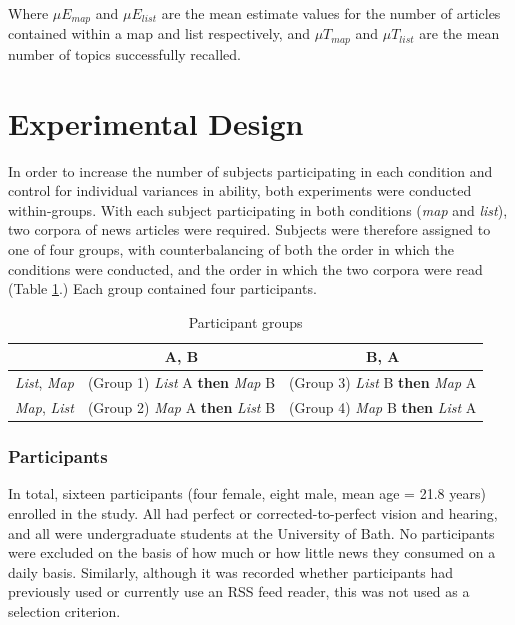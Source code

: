 Where $\mu{E}_{map}$ and $\mu{E}_{list}$ are the mean estimate values for the number of articles contained within a map and list respectively, and $\mu{T}_{map}$ and $\mu{T}_{list}$ are the mean number of topics successfully recalled.

\section{Experimental Design}

In order to increase the number of subjects participating in each condition and control for individual variances in ability, both experiments were conducted within-groups. With each subject participating in both conditions (\textit{map} and \textit{list}), two corpora of news articles were required. Subjects were therefore assigned to one of four groups, with counterbalancing of both the order in which the conditions were conducted, and the order in which the two corpora were read (Table \ref{tab:experimentalgroups}.) Each group contained four participants.\\

\begin{table}[htbp!]
\centering
\begin{tabular}{|r|c|c|}
\hline
  & A, B & B, A\\
\hline
\textit{List}, \textit{Map} & (Group 1) \textit{List} A \textbf{then} \textit{Map} B & (Group 3) \textit{List} B \textbf{then} \textit{Map} A \\
\hline
\textit{Map}, \textit{List} & (Group 2) \textit{Map} A \textbf{then} \textit{List} B & (Group 4) \textit{Map} B \textbf{then} \textit{List} A \\
\hline
\end{tabular}
\caption{Participant groups} \label{tab:experimentalgroups}
\end{table}

\subsubsection{Participants}
In total, sixteen participants (four female, eight male, mean age = 21.8 years) enrolled in the study. All had perfect or corrected-to-perfect vision and hearing, and all were undergraduate students at the University of Bath. No participants were excluded on the basis of how much or how little news they consumed on a daily basis. Similarly, although it was recorded whether participants had previously used or currently use an RSS feed reader, this was not used as a selection criterion. 

